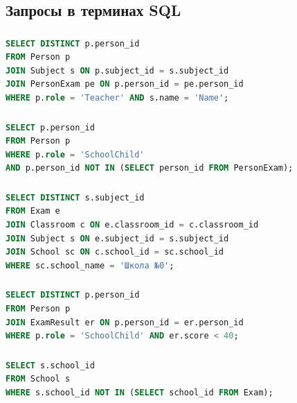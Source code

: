 \documentclass[a4paper]{article}
\begin{document}
\subsection{Запросы в терминах SQL}
\subsubsection{}
\label{subsec:sql1}
\begin{lstlisting}[language=SQL, label={lst:sql1}, frame=none, numbers=none, caption={SQL-запрос 1}]
SELECT DISTINCT p.person_id
FROM Person p
JOIN Subject s ON p.subject_id = s.subject_id
JOIN PersonExam pe ON p.person_id = pe.person_id
WHERE p.role = 'Teacher' AND s.name = 'Name';
            \end{lstlisting}
\subsubsection{}
\label{subsec:sql2}
\begin{lstlisting}[language=SQL, label={lst:sql2}, frame=none, numbers=none, caption={SQL-запрос 2}]
SELECT p.person_id
FROM Person p
WHERE p.role = 'SchoolChild' 
AND p.person_id NOT IN (SELECT person_id FROM PersonExam);
\end{lstlisting}
\subsubsection{}
\label{subsec:sql3}
\begin{lstlisting}[language=SQL, label={lst:sql3}, frame=none, numbers=none, caption={SQL-запрос 3}]
SELECT DISTINCT s.subject_id
FROM Exam e
JOIN Classroom c ON e.classroom_id = c.classroom_id
JOIN Subject s ON e.subject_id = s.subject_id
JOIN School sc ON c.school_id = sc.school_id
WHERE sc.school_name = 'Школа №0';
            \end{lstlisting}
\subsubsection{}
\label{subsec:sql4}
\begin{lstlisting}[language=SQL, label={lst:sql4}, frame=none, numbers=none, caption={SQL-запрос 4}]
SELECT DISTINCT p.person_id
FROM Person p
JOIN ExamResult er ON p.person_id = er.person_id
WHERE p.role = 'SchoolChild' AND er.score < 40;
            \end{lstlisting}
\subsubsection{}
\label{subsec:sql5}
\begin{lstlisting}[language=SQL, label={lst:sql5}, frame=none, numbers=none, caption={SQL-запрос 5}]
SELECT s.school_id
FROM School s
WHERE s.school_id NOT IN (SELECT school_id FROM Exam);
\end{lstlisting}
\end{document}
